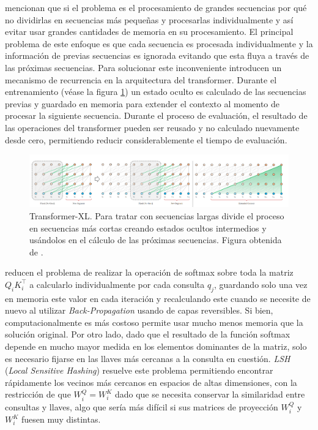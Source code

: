\citeauthor{DBLP:journals/corr/abs-1901-02860} mencionan que si el problema es el procesamiento de
grandes secuencias por qué no dividirlas en secuencias más pequeñas y procesarlas individualmente
y así evitar usar grandes cantidades de memoria en su procesamiento. El principal problema de este
enfoque es que cada secuencia es procesada individualmente y la información de previas secuencias es
ignorada evitando que esta fluya a través de las próximas secuencias. Para solucionar este
inconveniente introducen un mecanismo de recurrencia en la arquitectura del transformer. Durante el
entrenamiento (véase la figura \ref{fig:trans-xl}) un estado oculto es calculado de las secuencias previas y guardado
en memoria para extender el contexto al momento de procesar la siguiente secuencia. Durante el
proceso de evaluación, el resultado de las operaciones del transformer pueden ser reusado y no
calculado nuevamente desde cero, permitiendo reducir considerablemente el tiempo de evaluación.

\begin{figure}[ht!]
    \centering
    \includegraphics[width=0.8 \textwidth]{Chapters/2. Transformer/Figures/transformer/trans-XL.png}
    \caption{Transformer-XL. Para tratar con secuencias largas divide el proceso en secuencias más
             cortas creando estados ocultos intermedios y usándolos en el cálculo de las próximas
             secuencias. Figura obtenida de \cite{DBLP:journals/corr/abs-1901-02860}.}
    \label{fig:trans-xl}
\end{figure}

\citeauthor{DBLP:journals/corr/abs-2001-04451} reducen el problema de realizar la operación de softmax
sobre toda la matriz $Q_i K_i^\top$ a calcularlo individualmente por cada consulta $q_j$, guardando
solo una vez en memoria este valor en cada iteración y recalculando este cuando se necesite de nuevo
al utilizar \textit{Back-Propagation} usando de capas reversibles. Si bien, computacionalmente es
más costoso permite usar mucho
menos memoria que la solución original. Por otro lado, dado que el resultado de la función softmax
depende en mucho mayor medida en los elementos dominantes de la matriz, solo es necesario fijarse en
las llaves más cercanas a la consulta en cuestión. \textit{LSH} (\textit{Local Sensitive Hashing})
resuelve este problema permitiendo encontrar rápidamente los vecinos más cercanos en espacios de altas
dimensiones, con la  restricción de que $W_i^Q = W_i^K$ dado que se necesita conservar la
similaridad entre consultas y llaves, algo que sería más difícil si sus matrices de proyección
$W_i^Q$ y $W_i^K$ fuesen muy distintas.

